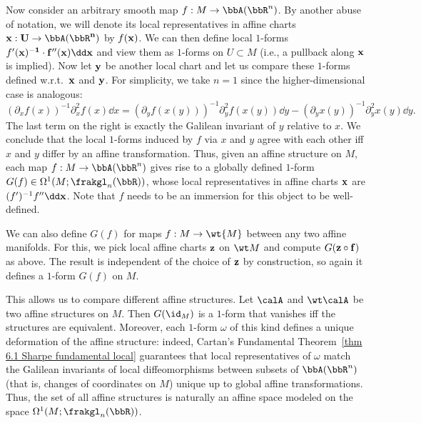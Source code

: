 \begin{example}
    Now consider an arbitrary smooth map $f:M\to \bbA(\bbR^n)$. By another abuse of notation, we will denote its local representatives in affine charts $\bf{x}:U\to \bbA(\bbR^n)$ by $f(\bf{x})$. We can then define local $1$-forms $f'(\bf{x})^{-1}\cdot f''(\bf{x})\dd \bf{x}$ and view them as $1$-forms on $U\subset M$ (i.e., a pullback along $\bf{x}$ is implied).  Now let $\bf{y}$ be another local chart and let us compare these $1$-forms defined w.r.t.\ $\bf{x}$ and $\bf{y}$. For simplicity, we take $n=1$ since the higher-dimensional case is analogous:
    \[(\partial_x f(x))^{-1}\partial_x^2 f(x)\dd x=(\partial_y f(x(y)))^{-1}\partial_y^2 f(x(y))\dd y-(\partial_y x(y))^{-1}\partial_y^2 x(y)\dd y.\]
    The last term on the right is exactly the Galilean invariant of $y$ relative to $x$. We conclude that the local $1$-forms induced by $f$ via $x$ and $y$ agree with each other iff $x$ and $y$ differ by an affine transformation. Thus, given an affine structure on $M$, each map $f:M\to \bbA(\bbR^n)$ gives rise to a globally defined $1$-form $G(f)\in \Omega^1(M;\frakgl_n(\bbR))$, whose local representatives in affine charts $\bf{x}$ are $(f')^{-1}f''\dd \bf{x}$. Note that $f$ needs to be an immersion for this object to be well-defined.

    We can also define $G(f)$ for maps $f:M\to \wt{M}$ between any two affine manifolds. For this, we pick local affine charts $\bf{z}$ on $\wt M$ and compute $G(\bf{z}\circ f)$ as above. The result is independent of the choice of $\bf{z}$ by construction, so again it defines a $1$-form $G(f)$ on $M$.

    This allows us to compare different affine structures. Let $\calA$ and $\wt\calA$ be two affine structures on $M$. Then $G(\id_M)$ is a $1$-form that vanishes iff the structures are equivalent. Moreover, each $1$-form $\omega$ of this kind defines a unique deformation of the affine structure: indeed, Cartan's Fundamental Theorem~\ref{thm 6.1 Sharpe fundamental local} guarantees that local representatives of $\omega$ match the Galilean invariants of local diffeomorphisms between subsets of $\bbA(\bbR^n)$ (that is, changes of coordinates on $M$) unique up to global affine transformations. Thus, the set of all affine structures is naturally an affine space modeled on the space $\Omega^1(M;\frakgl_n(\bbR))$.
    

\end{example}
